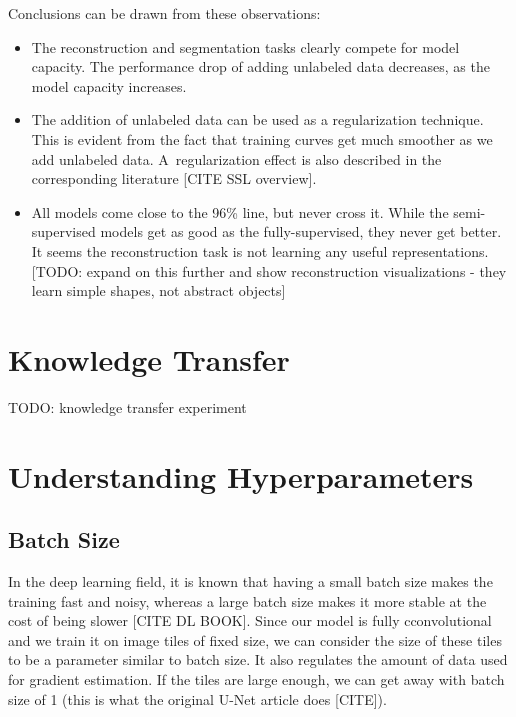 Conclusions can be drawn from these observations:

\begin{itemize}
    \item The reconstruction and segmentation tasks clearly compete for model capacity. The performance drop of adding unlabeled data decreases, as the model capacity increases.
    \item The addition of unlabeled data can be used as a regularization technique. This is evident from the fact that training curves get much smoother as we add unlabeled data. A~regularization effect is also described in the corresponding literature [CITE SSL overview].
    \item All models come close to the 96\% line, but never cross it. While the semi-supervised models get as good as the fully-supervised, they never get better. It seems the reconstruction task is not learning any useful representations. [TODO: expand on this further and show reconstruction visualizations - they learn simple shapes, not abstract objects]
\end{itemize}


\section{Knowledge Transfer}
\label{sec:KnowledgeTransfer}

TODO: knowledge transfer experiment


\section{Understanding Hyperparameters}
\label{sec:UnderstandingHyperparameters}


\subsection{Batch Size}
\label{sec:BatchSize}

In the deep learning field, it is known that having a small batch size makes the training fast and noisy, whereas a large batch size makes it more stable at the cost of being slower [CITE DL BOOK]. Since our model is fully cconvolutional and we train it on image tiles of fixed size, we can consider the size of these tiles to be a parameter similar to batch size. It also regulates the amount of data used for gradient estimation. If the tiles are large enough, we can get away with batch size of 1 (this is what the original U-Net article does [CITE]).

